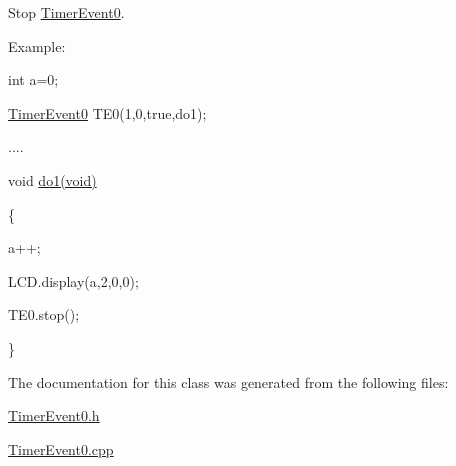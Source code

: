 \label{d3/dce/class_timer_event0_affbfc896cf7971809eb3f24254ecec1d}
\par
Stop \hyperlink{class_timer_event0}{TimerEvent0}.\par
 \par
Example:\par
\par
 int a=0; \par
 \hyperlink{class_timer_event0}{TimerEvent0} TE0(1,0,true,do1);\par
 .... \par
 void \hyperlink{main_8cpp_a6f6b769350d62a237ee918e52d844b28}{do1(void)}\par
 \{ \par
 a++; \par
 LCD.display(a,2,0,0);\par
 TE0.stop(); \par
 \}\par
 

The documentation for this class was generated from the following files:\begin{DoxyCompactItemize}
\item 
\hyperlink{_timer_event0_8h}{TimerEvent0.h}\item 
\hyperlink{_timer_event0_8cpp}{TimerEvent0.cpp}\end{DoxyCompactItemize}
